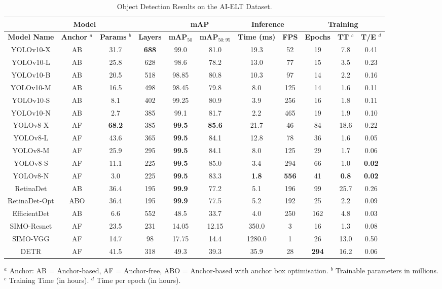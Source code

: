 \begin{table}[h]
    \centering
    \caption{Object Detection Results on the AI-ELT Dataset.}
    \label{fig:modelresults}
    \begin{tabular}{|c|c|c|c|c|c|c|c|c|c|c|}
    \hline
    \multicolumn{4}{|c|}{\textbf{Model}} & \multicolumn{2}{c|}{\textbf{mAP}} & \multicolumn{2}{c|}{\textbf{Inference}} & \multicolumn{3}{c|}{\textbf{Training}} \\
    \hline
    \textbf{Model Name} & \textbf{Anchor} $^a$ & \textbf{Params} $^b$ & \textbf{Layers} & \textbf{mAP$_{50}$} & \textbf{mAP$_{50:95}$} & \textbf{Time (ms)} & \textbf{FPS} & \textbf{Epochs} & \textbf{TT} $^c$ & \textbf{T/E} $^d$ \\ 
    \hline
    YOLOv10-X & AB & 31.7 & \textbf{688} & 99.0 & 81.0 & 19.3 & 52 & 19 & 7.8 & 0.41 \\ 
    YOLOv10-L & AB & 25.8 & 628 & 98.6 & 78.2 & 13.0 & 77 & 15 & 3.5 & 0.23 \\ 
    YOLOv10-B & AB & 20.5 & 518 & 98.85 & 80.8 & 10.3 & 97 & 14 & 2.2 & 0.16 \\ 
    YOLOv10-M & AB & 16.5 & 498 & 98.45 & 79.8 & 8.0 & 125 & 14 & 1.6 & 0.11 \\ 
    YOLOv10-S & AB & 8.1 & 402 & 99.25 & 80.9 & 3.9 & 256 & 16 & 1.8 & 0.11 \\ 
    YOLOv10-N & AB & 2.7 & 385 & 99.1 & 81.7 & 2.2 & 465 & 19 & 1.9 & 0.10 \\ 
    YOLOv8-X & AF & \textbf{68.2} & 385 & \textbf{99.5} & \textbf{85.6} & 21.7 & 46 & 84 & 18.6 & 0.22 \\ 
    YOLOv8-L & AF & 43.6 & 365 & \textbf{99.5} & 84.1 & 12.8 & 78 & 36 & 1.6 & 0.05 \\ 
    YOLOv8-M & AF & 25.9 & 295 & \textbf{99.5} & 84.1 & 8.0 & 125 & 29 & 1.7 & 0.06 \\ 
    YOLOv8-S & AF & 11.1 & 225 & \textbf{99.5} & 85.0 & 3.4 & 294 & 66 & 1.0 & \textbf{0.02} \\ 
    YOLOv8-N & AF & 3.0 & 225 & \textbf{99.5} & 83.3 & \textbf{1.8} & \textbf{556} & 41 & \textbf{0.8} & \textbf{0.02} \\ 
    RetinaDet & AB & 36.4 & 195 & \textbf{99.9} & 77.2 & 5.1 & 196 & 99 & 25.7 & 0.26 \\ 
    RetinaDet-Opt & ABO & 36.4 & 195 & \textbf{99.9} & 77.5 & 5.2 & 192 & 25 & 2.2 & 0.09 \\ 
    EfficientDet & AB & 6.6 & 552 & 48.5 & 33.7 & 4.0 & 250 & 162 & 4.8 & 0.03 \\ 
    SIMO-Resnet & AF & 23.5 & 231 & 14.05 & 12.15 & 350.0 & 3 & 16 & 1.3 & 0.08 \\ 
    SIMO-VGG & AF & 14.7 & 98 & 17.75 & 14.4 & 1280.0 & 1 & 26 & 13.0 & 0.50 \\ 
    DETR & AF & 41.5 & 318 & 49.3 & 39.3 & 35.9 & 28 & \textbf{294} & 16.2 & 0.06 \\
    \hline
\end{tabular}
\newline
\footnotesize{$^a$ Anchor: AB = Anchor-based, AF = Anchor-free, ABO = Anchor-based with anchor box optimisation. $^b$ Trainable parameters in millions. $^c$ Training Time (in hours). $^d$ Time per epoch (in hours).}
\end{table}


